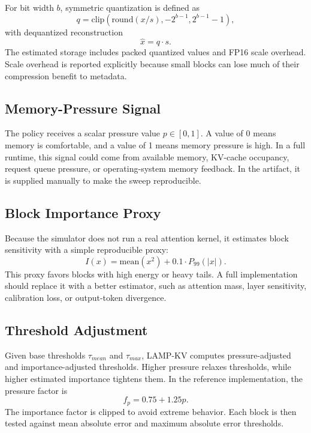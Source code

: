 \documentclass[11pt]{article}
\begin{document}
For bit width $b$, symmetric quantization is defined as
\begin{equation}
    q = \mathrm{clip}\left(\mathrm{round}(x/s), -2^{b-1}, 2^{b-1}-1\right),
\end{equation}
with dequantized reconstruction
\begin{equation}
    \hat{x} = q\cdot s.
\end{equation}
The estimated storage includes packed quantized values and FP16 scale overhead. Scale overhead is reported explicitly because small blocks can lose much of their compression benefit to metadata.

\subsection{Memory-Pressure Signal}
The policy receives a scalar pressure value $p\in[0,1]$. A value of 0 means memory is comfortable, and a value of 1 means memory pressure is high. In a full runtime, this signal could come from available memory, KV-cache occupancy, request queue pressure, or operating-system memory feedback. In the artifact, it is supplied manually to make the sweep reproducible.

\subsection{Block Importance Proxy}
Because the simulator does not run a real attention kernel, it estimates block sensitivity with a simple reproducible proxy:
\begin{equation}
    I(x) = \mathrm{mean}(x^2) + 0.1\cdot P_{99}(|x|).
\end{equation}
This proxy favors blocks with high energy or heavy tails. A full implementation should replace it with a better estimator, such as attention mass, layer sensitivity, calibration loss, or output-token divergence.

\subsection{Threshold Adjustment}
Given base thresholds $\tau_{mean}$ and $\tau_{max}$, LAMP-KV computes pressure-adjusted and importance-adjusted thresholds. Higher pressure relaxes thresholds, while higher estimated importance tightens them. In the reference implementation, the pressure factor is
\begin{equation}
    f_p = 0.75 + 1.25p.
\end{equation}
The importance factor is clipped to avoid extreme behavior. Each block is then tested against mean absolute error and maximum absolute error thresholds.
\end{document}
